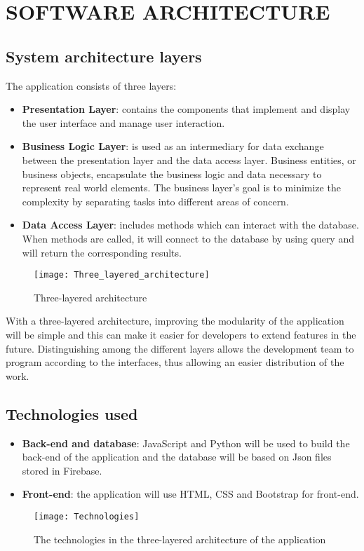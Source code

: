 \section{SOFTWARE ARCHITECTURE}
\subsection{System architecture layers}
The application consists of three layers:
\begin{itemize}
	\item \textbf{Presentation Layer}: contains the components that implement and display the user interface and manage user interaction.
	\item \textbf{Business Logic Layer}: is used as an intermediary for data exchange between the presentation layer and the data access layer. Business entities, or business objects, encapsulate the business logic and data necessary to represent real world elements. The business layer's goal is to minimize the complexity by separating tasks into different areas of concern.  
	\item \textbf{Data Access Layer}: includes methods which can interact with the database. When methods are called, it will connect to the database by using query and will return the corresponding results.  
\end{itemize} 
\begin{figure}[H]
	\centering
	\texttt{[image: Three\_layered\_architecture]}
	\caption{Three-layered architecture}
\end{figure}
With a three-layered architecture, improving the modularity of the application will be simple and this can make it easier for developers to extend features in the future. Distinguishing among the different layers allows the development team to program according to the interfaces, thus allowing an easier distribution of the work.  
\subsection{Technologies used}
\begin{itemize}
	\item \textbf{Back-end and database}: JavaScript and Python will be used to build the back-end of the application and the database will be based on Json files stored in Firebase.
	\item \textbf{Front-end}: the application will use HTML, CSS and Bootstrap for front-end.
\end{itemize}
\begin{figure}[H]
	\centering
	\texttt{[image: Technologies]}
	\caption{The technologies in the three-layered architecture of the application}
\end{figure}
